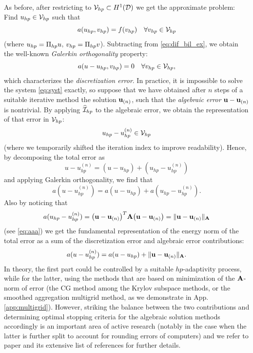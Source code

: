As before, after restricting to $\Space_{hp} \subset H^1(\VV)$ we get the approximate problem:
Find $u_{hp}\in \Space_{hp}$ such that $$ a(u_{hp}, v_{hp}) = f(v_{hp}) \quad \forall v_{hp} \in \Space_{hp} $$ (where
$u_{hp} = \Projop[hp] u$, $v_{hp} = \Projop[hp] v$). Subtracting from \eqref{eq:dif_bil_ex}, we obtain the well-known
\textit{Galerkin orthogonality} property:
$$ a(u - u_{hp}, v_{hp}) = 0 \quad \forall v_{hp}\in \Space_{hp}, $$ which characterizes the \textit{discretization
error}. In practice, it is impossible to solve the system \eqref{eq:syst} exactly, so suppose that we have obtained
after $n$ steps of a suitable iterative method the solution $\mat{u}_{(n)}$, such that the \textit{algebraic error}
$\mat{u} - \mat{u}_{(n)}$ is nontrivial. By applying $\PihHP$ to the algebraic error, we obtain the representation of
that error in $\Space_{hp}$:
$$ u_{hp} - u_{hp}^{(n)} \in \Space_{hp} $$ (where we temporarily shifted the iteration index to improve readability).
Hence, by decomposing the total error as $$ u - u_{hp}^{(n)} = (u-u_{hp}) + (u_{hp}-u_{hp}^{(n)}) $$ and applying
Galerkin orthogonality, we find that $$ a(u - u_{hp}^{(n)}) = a(u-u_{hp}) + a(u_{hp}-u_{hp}^{(n)}).
$$ Also by noticing that $$ a(u_{hp}-u_{hp}^{(n)}) = \bigl(\mat{u} - \mat{u}_{(n)}\bigr)^T\mat{A}\bigl(\mat{u} -
\mat{u}_{(n)}\bigr) = \norm[\mat{A}]{\mat{u} - \mat{u}_{(n)}} $$ (see \eqref{eq:aaa}) we get the fundamental
representation of the energy norm of the total error as a sum of the discretization error and algebraic error
contributions:
$$ a(u - u_{hp}^{(n)}) = a(u-u_{hp}) + \norm[\mat{A}]{\mat{u} - \mat{u}_{(n)}}.
$$ In theory, the first part could be controlled by a suitable $hp$-adaptivity process, while for the latter, using the
methods that are based on minimization of the $\mat{A}$-norm of error (the CG method among the Krylov subspace methods,
or the smoothed aggregation multigrid method, as we demonstrate in App. \ref{app:multigrid}). However, striking the
balance between the two contributions and determining optimal stopping criteria for the algebraic solution methods
accordingly is an important area of active research (notably in the case when the latter is further split to account for
rounding errors of computers) and we refer to paper \cite{Arilie} and its extensive list of references for further
details.
